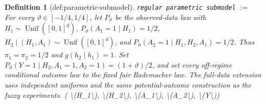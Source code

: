 \documentclass{article}
\newtheorem{definition}{Definition}
\begin{document}
\begin{definition}[def:parametric-submodel]\label{def:parametric-submodel}
\texttt{regular parametric submodel} $:=$ For every \(\vartheta\in[-1/4,1/4]\), let \(P_\vartheta\) be the observed-data law with \(H_1\sim\operatorname{Unif}([0,1]^d)\), \(P_\vartheta(A_1=1\mid H_1)=1/2\), \(H_2\mid(H_1,A_1)\sim\operatorname{Unif}([0,1]^d)\), and \(P_\vartheta(A_2=1\mid H_1,H_2,A_1)=1/2\). Thus \(\pi_1=\pi_2=1/2\) and \(g(h_2\mid h_1)=1\). Set \(P_\vartheta(Y=1\mid H_2,A_1=1,A_2=1)=(1+\vartheta)/2\), and set every off-regime conditional outcome law to the fixed fair Rademacher law. The full-data extension uses independent uniforms and the same potential-outcome construction as the fuzzy experiments. \quad ( \textbackslash{}(H\_1\textbackslash{}), \textbackslash{}(H\_2\textbackslash{}), \textbackslash{}(A\_1\textbackslash{}), \textbackslash{}(A\_2\textbackslash{}), \textbackslash{}(Y\textbackslash{}))
\end{definition}
\end{document}
